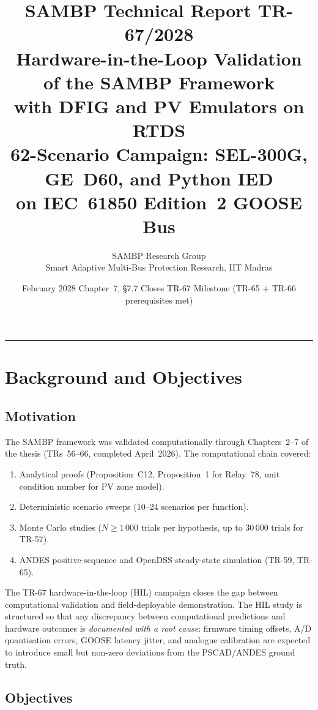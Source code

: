 \documentclass[11pt, a4paper]{article}
\title{\textbf{\textsf{\color{sambpblue}SAMBP Technical Report TR-67/2028}}\\[6pt]
  \Large Hardware-in-the-Loop Validation of the SAMBP Framework\\
  with DFIG and PV Emulators on RTDS\\[4pt]
  \normalsize 62-Scenario Campaign: SEL-300G, GE~D60, and Python IED\\
  on IEC~61850 Edition~2 GOOSE Bus}
\author{SAMBP Research Group\\[2pt]
  \small Smart Adaptive Multi-Bus Protection Research, IIT Madras}
\date{February 2028\quad\textbar\quad
  Chapter~7, \S7.7\quad\textbar\quad
  Closes TR-67 Milestone (TR-65 + TR-66 prerequisites met)}
\begin{document}
\maketitle
\tableofcontents
\vspace{6pt}\hrule\vspace{10pt}

\section{Background and Objectives}
\label{sec:background}

\subsection{Motivation}

The SAMBP framework was validated computationally through Chapters~2--7 of
the thesis (TRs~56--66, completed April~2026).
The computational chain covered:
\begin{enumerate}
  \item Analytical proofs (Proposition~C12, Proposition~1 for Relay~78,
    unit condition number for PV zone model).
  \item Deterministic scenario sweeps (10--24 scenarios per function).
  \item Monte Carlo studies ($N \geq 1\,000$ trials per hypothesis,
    up to 30\,000 trials for TR-57).
  \item ANDES positive-sequence and OpenDSS steady-state simulation
    (TR-59, TR-65).
\end{enumerate}

The TR-67 hardware-in-the-loop (HIL) campaign closes the gap between
computational validation and field-deployable demonstration.
The HIL study is structured so that any discrepancy between computational
predictions and hardware outcomes is \emph{documented with a root cause}:
firmware timing offsets, A/D quantisation errors, GOOSE latency jitter,
and analogue calibration are expected to introduce small but non-zero
deviations from the PSCAD/ANDES ground truth.

\subsection{Objectives}
\end{document}
